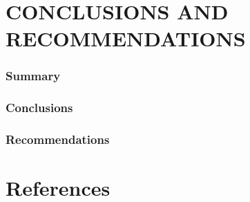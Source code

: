 \documentclass[12pt,a4paper]{article}
\begin{document}
\begin{flushleft}
		\section{CONCLUSIONS AND RECOMMENDATIONS}
		\subsubsection{Summary}
		\subsubsection{ Conclusions}
		\subsubsection{Recommendations}
		\section{References}
	\end{flushleft}
\end{document}
